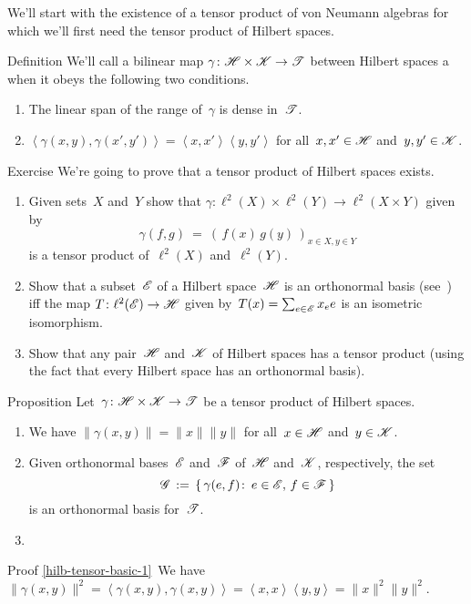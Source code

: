 \documentclass[a]{subfiles}
\begin{document}
\begin{parsec}%
\begin{point}%
We'll start with the existence
of a tensor product of von Neumann algebras
for which we'll first need the tensor product
of Hilbert spaces.
\end{point}
\begin{point}{Definition}%
We'll call a bilinear map $\gamma\colon \mathscr{H}\times\mathscr{K}\to\mathscr{T}$
between Hilbert spaces
a 
when it obeys the following two conditions.
\begin{enumerate}
\item
The linear span of the range of~$\gamma$ is dense in~$\mathscr{T}$.
\item
$\left<\gamma(x,y),\gamma(x',y')\right>
= \left<x,x'\right> \left<y,y'\right>$
for all~$x,x'\in\mathscr{H}$ and~$y,y'\in\mathscr{K}$.
\end{enumerate}
\end{point}
\begin{point}{Exercise}%
We're going to prove that a tensor product of Hilbert spaces
exists.
\begin{enumerate}
\item
Given sets~$X$ and~$Y$
show that  $\gamma\colon\ell^2(X)\times \ell^2(Y)\to \ell^2(X\times Y)$
given by
\begin{equation*}
	\gamma(f,g)\ = \ (\,f(x)\,g(y)\,)_{x\in X,y\in Y}
\end{equation*}
is a tensor product of~$\ell^2(X)$ and~$\ell^2(Y)$.
\item
Show that a subset~$\mathscr{E}$ of a Hilbert space~$\mathscr{H}$
is an orthonormal basis (see~) iff
the map $T\colon \ell^2(\mathscr{E})\to\mathscr{H}$
given by~$T(x)=\sum_{e\in\mathscr{E}} x_e e$
is an isometric isomorphism.
\item
Show that any pair~$\mathscr{H}$ and~$\mathscr{K}$
of Hilbert spaces has a tensor product
(using the fact that every Hilbert space
has an orthonormal basis).
\end{enumerate}
\end{point}
\begin{point}{Proposition}%
Let~$\gamma\colon \mathscr{H}\times\mathscr{K}\to\mathscr{T}$
be a tensor product
of Hilbert spaces.
\begin{enumerate}
\item
\label{hilb-tensor-basic-1}
We have $\|\gamma(x,y)\|=\|x\|\|y\|$
for all~$x\in\mathscr{H}$ and~$y\in\mathscr{K}$.
\item
\label{hilb-tensor-basic-2}
Given orthonormal bases~$\mathscr{E}$ and~$\mathscr{F}$
of~$\mathscr{H}$ and~$\mathscr{K}$, respectively,
the set
\begin{equation*}
	\mathscr{G}\,:=\,\{\,\gamma(e,f)\colon \,e\in \mathscr{E},\,f\in\mathscr{F}\,\}
\end{equation*}
is an orthonormal basis for~$\mathscr{T}$.
\item
\end{enumerate}
\begin{point}{Proof}%
\ref{hilb-tensor-basic-1}\ 
We have $\|\gamma(x,y)\|^2
= \left<\gamma(x,y),\gamma(x,y)\right>
=\left<x,x\right>\left<y,y\right>
= \|x\|^2\|y\|^2$.


\end{point}
\end{point}
\end{parsec}
\end{document}
